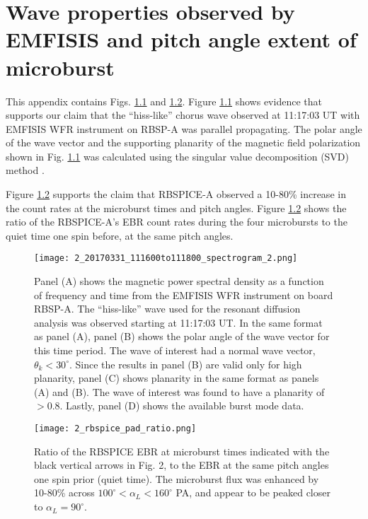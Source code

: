 \chapter{Wave properties observed by EMFISIS and pitch angle extent of microburst}\label{appendixa}

This appendix contains Figs. \ref{B1} and \ref{B2}. Figure \ref{B1} shows evidence that supports our claim that the ``hiss-like'' chorus wave observed at 11:17:03 UT with EMFISIS WFR instrument on RBSP-A was parallel propagating. The polar angle of the wave vector and the supporting planarity of the magnetic field polarization shown in Fig. \ref{B1} was calculated using the singular value decomposition (SVD) method \citep{Santolik2003SVD}.

Figure \ref{B2} supports the claim that RBSPICE-A observed a 10-80\% increase in the count rates at the microburst times and pitch angles. Figure \ref{B2} shows the ratio of the RBSPICE-A's EBR count rates during the four microbursts to the quiet time one spin before, at the same pitch angles.

\begin{figure}
\noindent\texttt{[image: 2\_20170331\_111600to111800\_spectrogram\_2.png]}
\caption{Panel (A) shows the magnetic power spectral density as a function of frequency and time from the EMFISIS WFR instrument on board RBSP-A. The ``hiss-like'' wave used for the resonant diffusion analysis was observed starting at 11:17:03 UT. In the same format as panel (A), panel (B) shows the polar angle of the wave vector for this time period. The wave of interest had a normal wave vector, $\theta_k < 30^\circ$. Since the results in panel (B) are valid only for high planarity, panel (C) shows planarity in the same format as panels (A) and (B). The wave of interest was found to have a planarity of $> 0.8$. Lastly, panel (D) shows the available burst mode data.}
\label{B1}
\end{figure}

\begin{figure}
\noindent\texttt{[image: 2\_rbspice\_pad\_ratio.png]}
\caption{Ratio of the RBSPICE EBR at microburst times indicated with the black vertical arrows in Fig. 2, to the EBR at the same pitch angles one spin prior (quiet time). The microburst flux was enhanced by 10-80\% across $100^\circ < \alpha_L < 160^\circ$ PA, and appear to be peaked closer to $\alpha_L = 90^\circ$.}
\label{B2}
\end{figure}